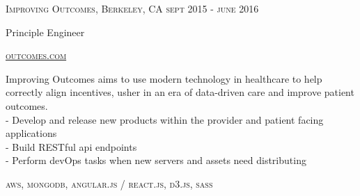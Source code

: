 {
  \textsc{\small{Improving Outcomes, Berkeley, CA
    \hfill
      {\raggedleft
        sept 2015 - june 2016
      } \\
    }
  }
  {\raggedright\large {
      Principle Engineer
  }}

  \textsc{\small\href{http://www.outcomes.com}{outcomes.com}}

  \normalsize{\raggedright
    Improving Outcomes aims to use modern technology in healthcare to help correctly align incentives, usher in an era of data-driven care and improve patient outcomes. \\
    - Develop and release new products within the provider and patient facing applications \\
    - Build RESTful api endpoints \\
    - Perform devOps tasks when new servers and assets need distributing
  }

  \textsc{\small{\color{highlight}
    aws,
    mongodb,
    angular.js / react.js,
    d3.js,
    sass
  }}
}
